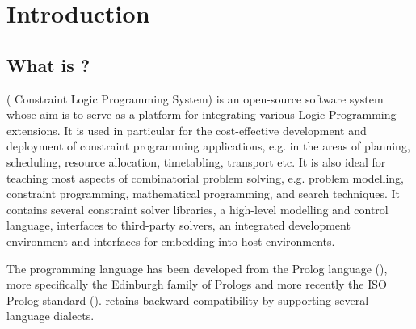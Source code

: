 %
%
%
%
%
%
%

\chapter{Introduction}
\label{chapintro}

\section{What is {\eclipse} ?}
{\eclipse}{} ({\eclipse} Constraint Logic Programming System)
is an open-source software system whose aim is to serve as a platform
for integrating various Logic Programming extensions.
It is used in particular for the cost-effective
development and deployment of constraint programming applications,
e.g. in the areas of planning, scheduling, resource allocation,
timetabling, transport etc.  It is also ideal for teaching most
aspects of combinatorial problem solving, e.g. problem modelling,
constraint programming, mathematical programming, and search
techniques.  It contains several constraint solver libraries, a
high-level modelling and control language, interfaces to third-party
solvers, an integrated development environment and interfaces for
embedding into host environments. 

The {\eclipse} programming language has been developed from the Prolog
language (\cite{clocksin81}), more specifically the Edinburgh family
of Prologs and more recently the ISO Prolog standard (\cite{isoprolog95}).
{\eclipse} retains backward compatibility by supporting several language
dialects.

